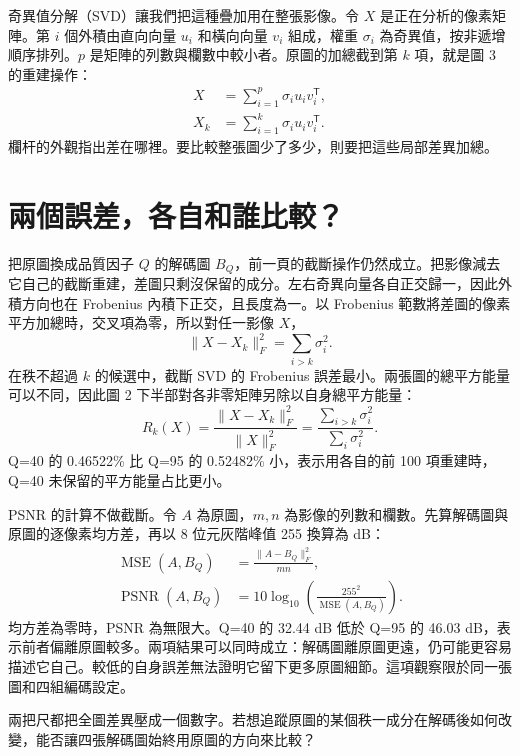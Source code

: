\documentclass[12pt,a4paper,onecolumn]{article}
\begin{document}
奇異值分解（SVD）讓我們把這種疊加用在整張影像。令 $X$ 是正在分析的像素矩陣。第 $i$ 個外積由直向向量 $u_i$ 和橫向向量 $v_i$ 組成，權重 $\sigma_i$ 為奇異值，按非遞增順序排列。$p$ 是矩陣的列數與欄數中較小者。原圖的加總截到第 $k$ 項，就是圖 3 的重建操作：
\begin{align}
 X &= \sum_{i=1}^{p}\sigma_i u_i v_i^{\mathsf T},\\
 X_k &= \sum_{i=1}^{k}\sigma_i u_i v_i^{\mathsf T}.
\end{align}
欄杆的外觀指出差在哪裡。要比較整張圖少了多少，則要把這些局部差異加總。

\newpage
\section*{兩個誤差，各自和誰比較？}

把原圖換成品質因子 $Q$ 的解碼圖 $B_Q$，前一頁的截斷操作仍然成立。把影像減去它自己的截斷重建，差圖只剩沒保留的成分。左右奇異向量各自正交歸一，因此外積方向也在 Frobenius 內積下正交，且長度為一。以 Frobenius 範數將差圖的像素平方加總時，交叉項為零，所以對任一影像 $X$，
\begin{equation}
 \lVert X-X_k\rVert_F^2=\sum_{i>k}\sigma_i^2 .
\end{equation}
在秩不超過 $k$ 的候選中，截斷 SVD 的 Frobenius 誤差最小。兩張圖的總平方能量可以不同，因此圖 2 下半部對各非零矩陣另除以自身總平方能量：
\begin{equation}
 R_k(X)=\frac{\lVert X-X_k\rVert_F^2}{\lVert X\rVert_F^2}
       =\frac{\sum_{i>k}\sigma_i^2}{\sum_i\sigma_i^2}.
\end{equation}
Q=40 的 0.46522\% 比 Q=95 的 0.52482\% 小，表示用各自的前 100 項重建時，Q=40 未保留的平方能量占比更小。

PSNR 的計算不做截斷。令 $A$ 為原圖，$m,n$ 為影像的列數和欄數。先算解碼圖與原圖的逐像素均方差，再以 8 位元灰階峰值 255 換算為 dB：
\begin{align}
 \operatorname{MSE}(A,B_Q)&=\frac{\lVert A-B_Q\rVert_F^2}{mn},\\
 \operatorname{PSNR}(A,B_Q)&=10\log_{10}\!\left(\frac{255^2}{\operatorname{MSE}(A,B_Q)}\right).
\end{align}
均方差為零時，PSNR 為無限大。Q=40 的 32.44 dB 低於 Q=95 的 46.03 dB，表示前者偏離原圖較多。兩項結果可以同時成立：解碼圖離原圖更遠，仍可能更容易描述它自己。較低的自身誤差無法證明它留下更多原圖細節。這項觀察限於同一張圖和四組編碼設定。

兩把尺都把全圖差異壓成一個數字。若想追蹤原圖的某個秩一成分在解碼後如何改變，能否讓四張解碼圖始終用原圖的方向來比較？
\end{document}
